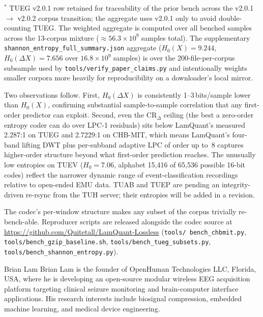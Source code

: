 \documentclass[journal]{IEEEtran}
\begin{document}
\begin{table}[!t]
\vspace{0.4em}
\noindent\footnotesize
$^\ast$ TUEG v2.0.1 row retained for traceability of the prior
bench across the v2.0.1 $\rightarrow$ v2.0.2 corpus transition;
the aggregate uses v2.0.1 only to avoid double-counting TUEG.
The weighted aggregate is computed over all benched samples
across the 13-corpus mixture ($\approx 56.3 \times 10^9$
samples total). The supplementary
\texttt{shannon\_entropy\_full\_summary.json} aggregate
($H_0(X) = 9.244$, $H_0(\Delta X) = 7.656$ over
$16.8 \times 10^9$ samples) is over the 200-file-per-corpus
subsample used by \texttt{tools/verify\_paper\_claims.py} and
intentionally weights smaller corpora more heavily for
reproducibility on a downloader's local mirror.
\end{table}

Two observations follow. First, $H_0(\Delta X)$ is consistently
1--3\,bits/sample lower than $H_0(X)$, confirming substantial
sample-to-sample correlation that any first-order predictor can
exploit. Second, even the $\text{CR}_{\Delta}$ ceiling (the best a
zero-order entropy coder can do over LPC-1 residuals) sits below
LamQuant's measured 2.287:1 on TUEG and 2.7229:1 on CHB-MIT,
which means LamQuant's four-band lifting DWT plus per-subband
adaptive LPC of order up to~8 captures higher-order structure
beyond what first-order prediction reaches. The unusually low
entropies on TUEV ($H_0 = 7.06$, alphabet 15{,}416 of 65{,}536
possible 16-bit codes) reflect the narrower dynamic range of
event-classification recordings relative to open-ended
EMU data. TUAB and TUEP are pending an integrity-driven
re-rsync from the TUH server; their entropies will be added in
a revision.

The codec's per-window structure makes any subset of the corpus
trivially re-bench-able. Reproducer scripts are released alongside
the codec source at
\url{https://github.com/Quitetall/LamQuant-Lossless} (\texttt{tools/
bench\_chbmit.py}, \texttt{tools/bench\_gzip\_baseline.sh},
\texttt{tools/bench\_tueg\_subsets.py},
\texttt{tools/bench\_shannon\_entropy.py}).


\begin{IEEEbiographynophoto}{Brian Lam}
Brian Lam is the founder of OpenHuman Technologies LLC, Florida, USA,
where he is developing an open-source modular wireless EEG acquisition
platform targeting clinical seizure monitoring and brain-computer
interface applications. His research interests include biosignal
compression, embedded machine learning, and medical device engineering.
\end{IEEEbiographynophoto}
\end{document}
